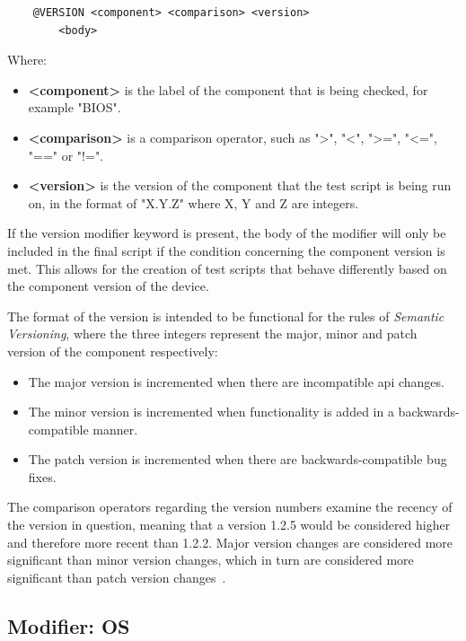 \begin{verbatim}
    @VERSION <component> <comparison> <version>
        <body>
\end{verbatim}

Where:
\begin{itemize}
    \item \textbf{<component>} is the label of the component that is being checked, for example "BIOS".
    \item \textbf{<comparison>} is a comparison operator, such as ">", "<", ">=", "<=", "==" or "!=".
    \item \textbf{<version>} is the version of the component that the test script is being run on, in the format of "X.Y.Z" where X, Y and Z are integers.
\end{itemize}

If the version modifier keyword is present, the body of the modifier will only be included in the final script if the condition concerning the component version is met. This allows for the creation of test scripts that behave differently based on the component version of the device. 

The format of the version is intended to be functional for the rules of \textit{Semantic Versioning}, where the three integers represent the major, minor and patch version of the component respectively:

\begin{itemize}
    \item The major version is incremented when there are incompatible \gls{api} changes.
    \item The minor version is incremented when functionality is added in a backwards-compatible manner.
    \item The patch version is incremented when there are backwards-compatible bug fixes.
\end{itemize}

The comparison operators regarding the version numbers examine the recency of the version in question, meaning that a version 1.2.5 would be considered higher and therefore more recent than 1.2.2. Major version changes are considered more significant than minor version changes, which in turn are considered more significant than patch version changes~\cite{SemanticVersioning}.

\subsection{Modifier: OS}

